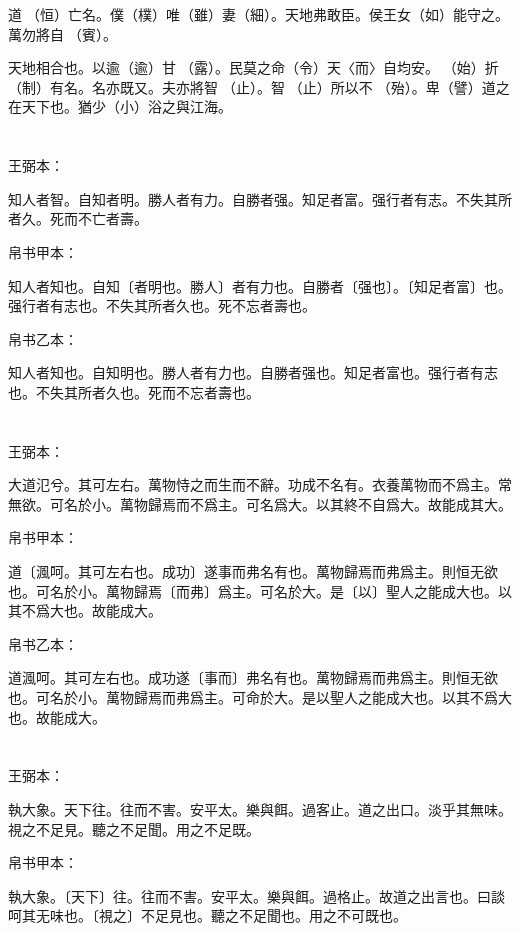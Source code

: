 \documentclass[a5paper]{ctexbook}
\begin{document}
    道𠄨（恒）亡名。僕（樸）唯（雖）妻（細）。天地弗敢臣。侯王女（如）能守之。萬勿將自󵦐（賓）。

    天地相合也。以逾（逾）甘𩂣（露）。民莫之命（令）天〈而〉自均安。󶴪（始）折（制）有名。名亦既又。夫亦將智𣥕（止）。智𣥕（止）所以不󶴪（殆）。卑（譬）道之在天下也。猶少（小）浴之與江海。

    \chapter{}
    王弼本：

    知人者智。自知者明。勝人者有力。自勝者强。知足者富。强行者有志。不失其所者久。死而不亡者壽。

    
    帛书甲本：

    知人者知也。自知〔者明也。勝人〕者有力也。自勝者〔强也〕。〔知足者富〕也。强行者有志也。不失其所者久也。死不忘者壽也。

    帛书乙本：

    知人者知也。自知明也。勝人者有力也。自勝者强也。知足者富也。强行者有志也。不失其所者久也。死而不忘者壽也。

    \chapter{}
    王弼本：

    大道氾兮。其可左右。萬物恃之而生而不辭。功成不名有。衣養萬物而不爲主。常無欲。可名於小。萬物歸焉而不爲主。可名爲大。以其終不自爲大。故能成其大。

    
    帛书甲本：

    道〔渢呵。其可左右也。成功〕遂事而弗名有也。萬物歸焉而弗爲主。則恒无欲也。可名於小。萬物歸焉〔而弗〕爲主。可名於大。是〔以〕聖人之能成大也。以其不爲大也。故能成大。

    帛书乙本：

    道渢呵。其可左右也。成功遂〔事而〕弗名有也。萬物歸焉而弗爲主。則恒无欲也。可名於小。萬物歸焉而弗爲主。可命於大。是以聖人之能成大也。以其不爲大也。故能成大。

    \chapter{}
    王弼本：

    執大象。天下往。往而不害。安平太。樂與餌。過客止。道之出口。淡乎其無味。視之不足見。聽之不足聞。用之不足既。

    
    帛书甲本：

    執大象。〔天下〕往。往而不害。安平太。樂與餌。過格止。故道之出言也。曰談呵其无味也。〔視之〕不足見也。聽之不足聞也。用之不可既也。
\end{document}
